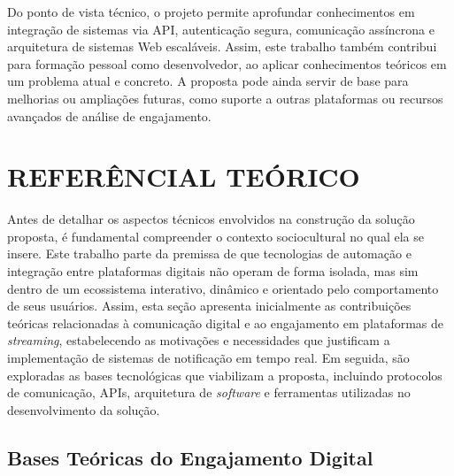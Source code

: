 Do ponto de vista técnico, o projeto permite aprofundar conhecimentos em integração de sistemas via API, autenticação segura, comunicação assíncrona e arquitetura de sistemas Web escaláveis. Assim, este trabalho também contribui para formação pessoal como desenvolvedor, ao aplicar conhecimentos teóricos em um problema atual e concreto. A proposta pode ainda servir de base para melhorias ou ampliações futuras, como suporte a outras plataformas ou recursos avançados de análise de engajamento.


\section{REFERÊNCIAL TEÓRICO}
\label{sec:estadoarte}

Antes de detalhar os aspectos técnicos envolvidos na construção da solução proposta, é fundamental compreender o contexto sociocultural no qual ela se insere. Este trabalho parte da premissa de que tecnologias de automação e integração entre plataformas digitais não operam de forma isolada, mas sim dentro de um ecossistema interativo, dinâmico e orientado pelo comportamento de seus usuários. Assim, esta seção apresenta inicialmente as contribuições teóricas relacionadas à comunicação digital e ao engajamento em plataformas de \textit{streaming}, estabelecendo as motivações e necessidades que justificam a implementação de sistemas de notificação em tempo real. Em seguida, são exploradas as bases tecnológicas que viabilizam a proposta, incluindo protocolos de comunicação, APIs, arquitetura de \textit{software} e ferramentas utilizadas no desenvolvimento da solução.

\subsection{Bases Teóricas do Engajamento Digital}


